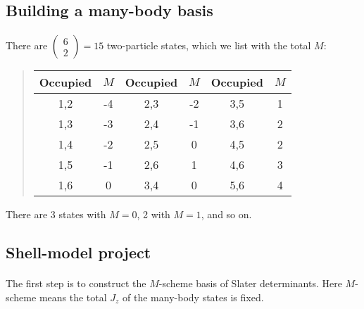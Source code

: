 \documentclass[%
oneside,                 %
final,                   %
10pt]{article}
\begin{document}
\noindent



\subsection*{Building a many-body basis}

\paragraph{}
There are $\left ( \begin{array}{c} 6 \\ 2 \end{array} \right) = 15$ two-particle states, 
which we list with the total $M$:


\begin{quote}
\begin{tabular}{cccccc}
\hline
\multicolumn{1}{c}{ Occupied } & \multicolumn{1}{c}{ $M$ } & \multicolumn{1}{c}{ Occupied } & \multicolumn{1}{c}{ $M$ } & \multicolumn{1}{c}{ Occupied } & \multicolumn{1}{c}{ $M$ } \\
\hline
1,2      & -4  & 2,3      & -2  & 3,5      & 1   \\
1,3      & -3  & 2,4      & -1  & 3,6      & 2   \\
1,4      & -2  & 2,5      & 0   & 4,5      & 2   \\
1,5      & -1  & 2,6      & 1   & 4,6      & 3   \\
1,6      & 0   & 3,4      & 0   & 5,6      & 4   \\
\hline
\end{tabular}
\end{quote}

\noindent
There are 3 states with $M= 0$, 2 with $M = 1$, and so on.



\subsection*{Shell-model project}

\paragraph{}

The first step  is to construct the $M$-scheme basis of Slater determinants.
Here $M$-scheme means the total $J_z$ of the many-body states is fixed.
\end{document}
